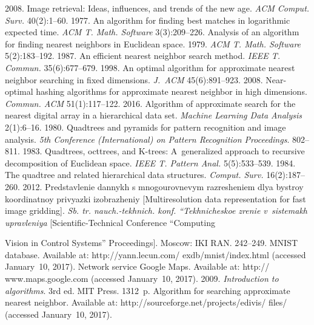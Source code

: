 \begin{multicols}{2}
{{\begin{thebibliography}{99}
 2008. Image retrieval: Ideas, influences, and trends 
of the new age. \textit{ACM Comput. Surv.} 40(2):1--60.
 1977. An algorithm for finding best matches in 
logarithmic expected time. \textit{ACM T. Math. Software} 3(3):209--226.
 Analysis of an algorithm for finding nearest neighbors in Euclidean space. 1979. 
\textit{ACM T. Math. Software} 5(2):183--192.
 1987. An efficient nearest neighbor search method. 
\textit{IEEE T. Commun.} 35(6):677--679.
 1998. An optimal algorithm 
for approximate nearest neighbor searching in fixed dimensions. \textit{J.~ACM} 45(6):891--923.
 2008. Near-optimal hashing algorithms for approximate nearest 
neighbor in high dimensions. \textit{Commun. ACM} 51(1):117--122.
 2016. Algorithm of approximate 
search for the nearest digital array in a hierarchical data set. \textit{Machine Learning Data 
Analysis} 2(1):6--16. 
 1980. Quadtrees and pyramids for pattern recognition and image analysis. 
\textit{5th Conference (International) on Pattern Recognition Proceedings}. 802--811.
 1983. Quadtrees, octtrees, and K-trees: A~generalized 
approach to recursive decomposition of Euclidean space. \textit{IEEE T. Pattern
Anal.} 5(5):533--539.
 1984. The quadtree and related hierarchical data structures. 
\textit{Comput. Surv.} 16(2):187--260.
 2012. Predstavlenie dannykh s mnogourovnevym 
razresheniem dlya bystroy koordinatnoy privyazki izobrazheniy [Multiresolution data 
representation for fast image gridding]. \textit{Sb. tr. nauch.-tekhnich. konf. ``Tekhnicheskoe zrenie 
v~sistemakh upravleniya} [Scientific-Technical Conference ``Computing\linebreak\vspace*{-12pt}

\pagebreak

\noindent
 Vision in Control 
Systems'' Proceedings]. Moscow: IKI RAN. 242--249.
MNIST database. Available at: {\sf http://yann.lecun.com/ exdb/mnist/index.html} (accessed 
January~10, 2017). 
Network service Google Maps. Available at: {\sf http:// www.maps.google.com} (accessed 
January~10, 2017). 
 2009. \textit{Introduction to 
algorithms}. 3rd ed. MIT Press. 1312~p.
Algorithm for searching approximate nearest neighbor. Available at: {\sf 
http://sourceforge.net/projects/edivis/ files/} (accessed January~10, 2017).
\end{thebibliography}

 }
 }

\end{multicols}

